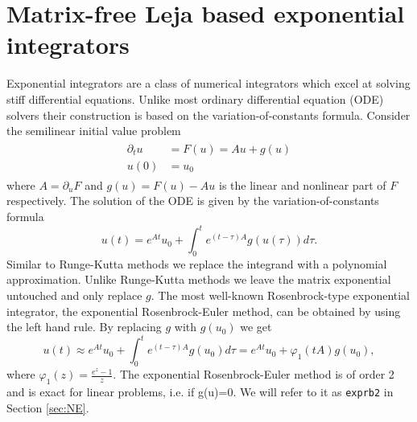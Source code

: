 \documentclass{scrartcl}
\begin{document}
	\section{Matrix-free Leja based exponential integrators} \label{sec:expint}
	Exponential integrators are a class of numerical integrators which excel at solving stiff differential equations. Unlike most ordinary differential equation (ODE) solvers their construction is based on the variation-of-constants formula. Consider the semilinear initial value problem
	\begin{align}
	\begin{split}
	\partial_tu &= F(u) = Au + g(u) \\ 
	u(0) &= u_0
	\end{split}\label{semilinear}
	\end{align}
	where $A = \partial_uF$ and $g(u) = F(u)-Au$ is the linear and nonlinear part of $F$ respectively. The solution of the ODE is given by the variation-of-constants formula
	\[
	u(t) = e^{At}u_0 + \int_{0}^{t}e^{(t-\tau)A}g(u(\tau))d\tau.
	\]
	Similar to Runge-Kutta methods we replace the integrand with a polynomial approximation. Unlike Runge-Kutta methods we leave the matrix exponential untouched and only replace $g$. The most well-known Rosenbrock-type exponential integrator, the exponential Rosenbrock-Euler method, can be obtained by using the left hand rule. By replacing $g$ with $g(u_0)$ we get
	\[
	u(t) \approx e^{At}u_0 + \int_{0}^{t}e^{(t-\tau)A}g(u_0)d\tau = e^{At}u_0 + \varphi_1(tA)g(u_0),
	\]
	where $\varphi_1(z) = \frac{e^z-1}z$. The exponential Rosenbrock-Euler method is of order 2 and is exact for linear problems, i.e. if g(u)=0. We will refer to it as \texttt{exprb2} in Section \ref{sec:NE}.
\end{document}
